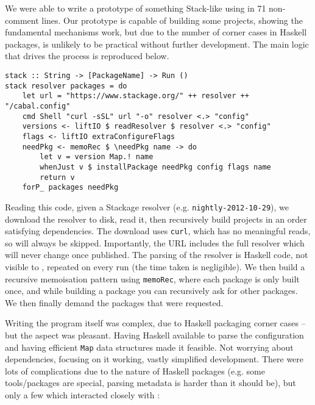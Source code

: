 We were able to write a prototype of something Stack-like using \Rattle in 71 non-comment lines. Our prototype is capable of building some projects, showing the fundamental mechanisms work, but due to the number of corner cases in Haskell packages, is unlikely to be practical without further development. The main logic that drives the process is reproduced below.

\begin{small}
\begin{verbatim}
stack :: String -> [PackageName] -> Run ()
stack resolver packages = do
    let url = "https://www.stackage.org/" ++ resolver ++ "/cabal.config"
    cmd Shell "curl -sSL" url "-o" resolver <.> "config"
    versions <- liftIO $ readResolver $ resolver <.> "config"
    flags <- liftIO extraConfigureFlags
    needPkg <- memoRec $ \needPkg name -> do
        let v = version Map.! name
        whenJust v $ installPackage needPkg config flags name
        return v
    forP_ packages needPkg
\end{verbatim}
\end{small}

Reading this code, given a Stackage resolver (e.g. \texttt{nightly-2012-10-29}), we download the resolver to disk, read it, then recursively build projects in an order satisfying dependencies. The download uses \texttt{curl}, which has no meaningful reads, so will always be skipped. Importantly, the URL includes the full resolver which will never change once published. The parsing of the resolver is Haskell code, not visible to \Rattle, repeated on every run (the time taken is negligible). We then build a recursive memoisation pattern using \texttt{memoRec}, where each package is only built once, and while building a package you can recursively ask for other packages. We then finally demand the packages that were requested. %

Writing the program itself was complex, due to Haskell packaging corner cases -- but the \Rattle aspect was pleasant. Having Haskell available to parse the configuration and having efficient \texttt{Map} data structures made it feasible. Not worrying about dependencies, focusing on it working, vastly simplified development. There were lots of complications due to the nature of Haskell packages (e.g. some tools/packages are special, parsing metadata is harder than it should be), but only a few which interacted closely with \Rattle:

